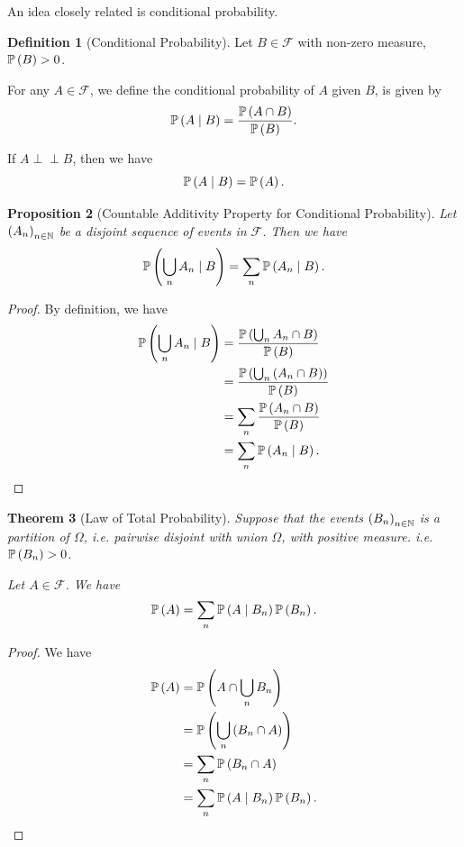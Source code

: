 \documentclass{article}
\newtheorem{theorem}{Theorem}[section]
\newtheorem{proposition}[theorem]{Proposition}
\theoremstyle{definition}
\newtheorem{definition}[theorem]{Definition}
\theoremstyle{remark}
\newcommand{\NN}{\mathbb{N}}
\newcommand{\Prob}{\mathbb{P}}
\newcommand{\eventSpace}{\mathcal{F}}
\newcommand{\Conditional}[2]{#1\mid #2}
\newcommand{\indp}{\mathrel{\perp\!\!\!\perp}}
\begin{document}
An idea closely related is conditional probability.

\begin{definition}[Conditional Probability]
    \label{def:conditional-prob}%
    Let \(B \in \eventSpace\) with non-zero measure, \(\Prob\pqty{B} > 0\).

    For any \(A \in \eventSpace\), we define the conditional probability of \(A\) given \(B\), is given by
    \[
        \Prob\pqty{\Conditional{A}{B}} = \frac{\Prob\pqty{A \cap B}}{\Prob\pqty{B}}.
    \]
\end{definition}

If \(A \indp B\), then we have
\[
    \Prob\pqty{\Conditional{A}{B}} = \Prob\pqty{A}.
\]

\begin{proposition}[Countable Additivity Property for Conditional Probability]
    \label{prop:countable-additivity-conditional}%
    Let \(\pqty{A_n}_{n \in \NN}\) be a disjoint sequence of events in \(\eventSpace\). Then we have
    \[
        \Prob\pqty{\Conditional{\bigcup_n A_n}{B}} = \sum_{n} \Prob\pqty{\Conditional{A_n}{B}}.
    \]
\end{proposition}

\begin{proof}
    By definition, we have
    \begin{align*}
        \Prob\pqty{\Conditional{\bigcup_{n} A_n}{B}} &= \frac{\Prob\pqty{\bigcup_n A_n \cap B}}{\Prob\pqty{B}} \\
        &= \frac{\Prob\pqty{\bigcup_n \pqty{A_n \cap B}}}{\Prob\pqty{B}} \\
        &= \sum_{n} \frac{\Prob\pqty{A_n \cap B}}{\Prob\pqty{B}} \\
        &= \sum_{n} \Prob\pqty{\Conditional{A_n}{B}}.
    \end{align*}
\end{proof}

\begin{theorem}[Law of Total Probability]
    \label{thm:law-total-probability}%
    Suppose that the events \(\pqty{B_n}_{n \in \NN}\) is a \emph{partition} of \(\Omega\), i.e. pairwise disjoint with union \(\Omega\), with positive measure. i.e. \(\Prob\pqty{B_n} > 0\).

    Let \(A \in \eventSpace\). We have
    \[
        \Prob\pqty{A} = \sum_{n} \Prob\pqty{\Conditional{A}{B_n}} \Prob\pqty{B_n}.
    \]
\end{theorem}

\begin{proof}
    We have
    \begin{align*}
        \Prob\pqty{A} &= \Prob\pqty{A \cap \bigcup_{n} B_n} \\
        &= \Prob\pqty{\bigcup_n \pqty{B_n \cap A}} \\
        &= \sum_{n} \Prob\pqty{B_n \cap A} \\
        &= \sum_{n} \Prob\pqty{\Conditional{A}{B_n}} \Prob\pqty{B_n}.
    \end{align*}
\end{proof}
\end{document}
